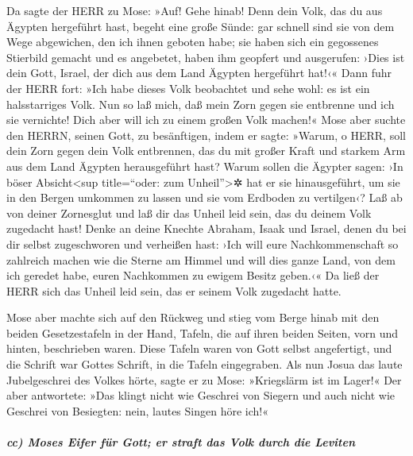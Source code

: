  Da sagte der HERR zu Mose: »Auf! Gehe hinab! Denn dein
Volk, das du aus Ägypten hergeführt hast, begeht eine große Sünde:
 gar schnell sind sie von dem Wege abgewichen, den ich
ihnen geboten habe; sie haben sich ein gegossenes Stierbild gemacht und
es angebetet, haben ihm geopfert und ausgerufen: ›Dies ist dein Gott,
Israel, der dich aus dem Land Ägypten hergeführt hat!‹« 
Dann fuhr der HERR fort: »Ich habe dieses Volk beobachtet und sehe wohl:
es ist ein halsstarriges Volk.  Nun so laß mich, daß mein
Zorn gegen sie entbrenne und ich sie vernichte! Dich aber will ich zu
einem großen Volk machen!«  Mose aber suchte den HERRN,
seinen Gott, zu besänftigen, indem er sagte: »Warum, o HERR, soll dein
Zorn gegen dein Volk entbrennen, das du mit großer Kraft und starkem Arm
aus dem Land Ägypten herausgeführt hast?  Warum sollen
die Ägypter sagen: ›In böser Absicht\textless sup title=``oder: zum
Unheil''\textgreater✲ hat er sie hinausgeführt, um sie in den Bergen
umkommen zu lassen und sie vom Erdboden zu vertilgen‹? Laß ab von deiner
Zornesglut und laß dir das Unheil leid sein, das du deinem Volk
zugedacht hast!  Denke an deine Knechte Abraham, Isaak
und Israel, denen du bei dir selbst zugeschworen und verheißen hast:
›Ich will eure Nachkommenschaft so zahlreich machen wie die Sterne am
Himmel und will dies ganze Land, von dem ich geredet habe, euren
Nachkommen zu ewigem Besitz geben.‹«  Da ließ der HERR
sich das Unheil leid sein, das er seinem Volk zugedacht hatte.

 Mose aber machte sich auf den Rückweg und stieg vom
Berge hinab mit den beiden Gesetzestafeln in der Hand, Tafeln, die auf
ihren beiden Seiten, vorn und hinten, beschrieben waren. 
Diese Tafeln waren von Gott selbst angefertigt, und die Schrift war
Gottes Schrift, in die Tafeln eingegraben.  Als nun Josua
das laute Jubelgeschrei des Volkes hörte, sagte er zu Mose: »Kriegslärm
ist im Lager!«  Der aber antwortete: »Das klingt nicht
wie Geschrei von Siegern und auch nicht wie Geschrei von Besiegten:
nein, lautes Singen höre ich!«

\hypertarget{cc-moses-eifer-fuxfcr-gott-er-straft-das-volk-durch-die-leviten}{%
\subparagraph{cc) Moses Eifer für Gott; er straft das Volk durch die
Leviten}\label{cc-moses-eifer-fuxfcr-gott-er-straft-das-volk-durch-die-leviten}}

